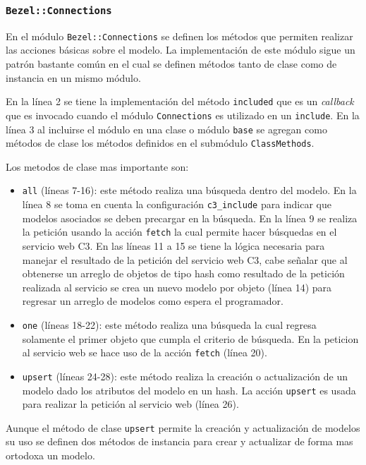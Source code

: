 \subsubsection{\texttt{Bezel::Connections}}

En el módulo \texttt{Bezel::Connections} se definen los métodos que permiten
realizar las acciones básicas sobre el modelo. La implementación de este módulo
sigue un patrón bastante común en el cual se definen métodos tanto de clase
como de instancia en un mismo módulo.



En la línea 2 se tiene la implementación del método \texttt{included} que es un
\textit{callback} que es invocado cuando el módulo \texttt{Connections} es
utilizado en un \texttt{include}. En la línea 3 al incluirse el módulo en una
clase o módulo \texttt{base} se agregan como métodos de clase los métodos
definidos en el submódulo \texttt{ClassMethods}.

Los metodos de clase mas importante son:
\begin{itemize}
\item \texttt{all} (líneas 7-16): este método realiza una búsqueda dentro del modelo.
  En la línea 8 se toma en cuenta la configuración \texttt{c3\_include} para indicar
  que modelos asociados se deben precargar en la búsqueda. En la línea 9 se realiza
  la petición usando la acción \texttt{fetch} la cual permite hacer búsquedas
  en el servicio web C3. En las líneas 11 a 15 se tiene la lógica necesaria para
  manejar el resultado de la petición del servicio web C3, cabe señalar que al
  obtenerse un arreglo de objetos de tipo hash como resultado de la petición
  realizada al servicio se crea un nuevo modelo por objeto (línea 14) para regresar
  un arreglo de modelos como espera el programador.
\item \texttt{one} (líneas 18-22): este método realiza una búsqueda la cual
  regresa solamente el primer objeto que cumpla el criterio de búsqueda. En la
  peticion al servicio web se hace uso de la acción \texttt{fetch} (línea 20).
\item \texttt{upsert} (líneas 24-28): este método realiza la creación o actualización
  de un modelo dado los atributos del modelo en un hash. La acción
  \texttt{upsert} es usada para realizar la petición al servicio web (línea 26).
\end{itemize}

Aunque el método de clase \texttt{upsert} permite la creación y actualización
de modelos su uso se definen dos métodos de instancia para crear y actualizar
de forma mas ortodoxa un modelo.

